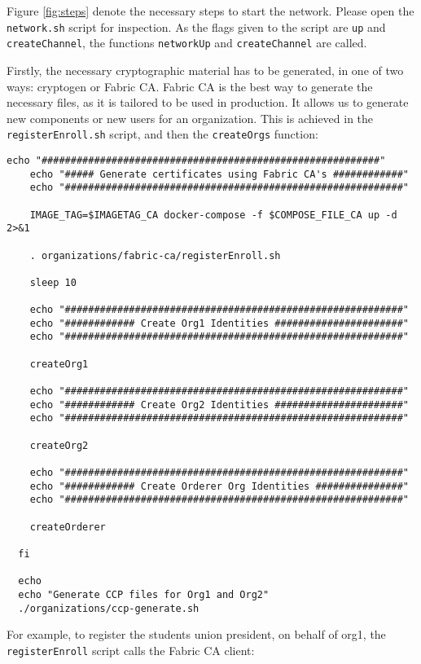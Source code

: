 \documentclass[12pt,a4paper]{article}
\theoremstyle{definition}
\begin{document}
Figure \ref{fig:steps} denote the necessary steps to start the network. Please open the \texttt{network.sh} script for inspection. As the flags given to the script are \texttt{up} and \texttt{createChannel}, the functions \texttt{networkUp} and \texttt{createChannel} are called. 

Firstly, the necessary cryptographic material has to be generated, in one of two ways: cryptogen or Fabric CA. Fabric CA is the best way to generate the necessary files, as it is tailored to be used in production. It allows us to generate new components or new users for an organization. This is achieved in the \texttt{registerEnroll.sh} script, and then the \texttt{createOrgs} function:

\begin{verbatim}
echo "##########################################################"
    echo "##### Generate certificates using Fabric CA's ############"
    echo "##########################################################"

    IMAGE_TAG=$IMAGETAG_CA docker-compose -f $COMPOSE_FILE_CA up -d 2>&1

    . organizations/fabric-ca/registerEnroll.sh

    sleep 10

    echo "##########################################################"
    echo "############ Create Org1 Identities ######################"
    echo "##########################################################"

    createOrg1

    echo "##########################################################"
    echo "############ Create Org2 Identities ######################"
    echo "##########################################################"

    createOrg2

    echo "##########################################################"
    echo "############ Create Orderer Org Identities ###############"
    echo "##########################################################"

    createOrderer

  fi

  echo
  echo "Generate CCP files for Org1 and Org2"
  ./organizations/ccp-generate.sh
\end{verbatim}

For example, to register the students union president, on behalf of org1, the \texttt{registerEnroll} script calls the Fabric CA client:
\end{document}
